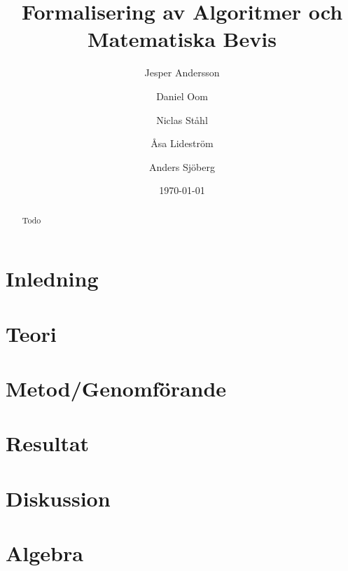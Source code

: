 \documentclass[a4paper]{article}
\title{Formalisering av Algoritmer och Matematiska Bevis}
\author[1]{Jesper Andersson}
\author[1]{Daniel Oom}
\author[1]{Niclas Ståhl}
\author[2]{Åsa Lideström}
\author[2]{Anders Sjöberg}
\affil[1]{Datateknik, Chalmers}
\affil[2]{Mattematik, Göteborgs Universitet}
\date{\today}
\begin{document}
\begin{abstract}
Todo
\end{abstract}

\maketitle
\thispagestyle{empty}
\newpage
\tableofcontents
\newpage

\section{Inledning}

\section{Teori}




\section{Metod/Genomförande}

\section{Resultat}

\section{Diskussion}


\printbibliography

\appendix
\section{Algebra}

\end{document}
